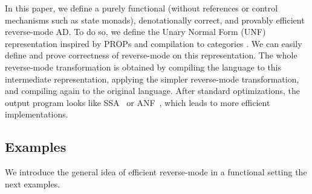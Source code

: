 


In this paper, we define a purely functional (without references or control mechanisms such as state monads), denotationally correct, and provably efficient reverse-mode AD. 
To do so, we define the Unary Normal Form (UNF) representation inspired by PROPs \cite{maclane1965categorical} %
and compilation to categories \cite{elliott2017compiling}.
We can easily define and prove correctness of reverse-mode on this representation. 
The whole reverse-mode transformation is obtained by compiling the language to this intermediate representation, applying the simpler reverse-mode transformation, and compiling again to the original language.
After standard optimizations, the output program looks like SSA~\cite{cytron1989efficient} or ANF~\cite{sabry1993reasoning}, which leads to more efficient implementations.



\subsection{Examples}

We introduce the general idea of efficient reverse-mode in a functional setting the next examples.

